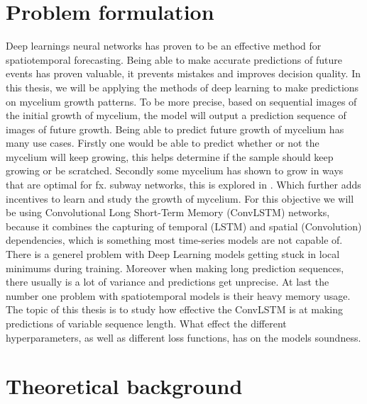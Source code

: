 \documentclass[a4paper,12pt]{article}
\begin{document}
\section{Problem formulation}
Deep learnings neural networks has proven to be an effective method for spatiotemporal forecasting. Being able to make accurate predictions of future events has proven valuable, it prevents mistakes and improves decision quality. In this thesis, we will be applying the methods of deep learning to make predictions on mycelium growth patterns.
To be more precise, based on sequential images of the initial growth of mycelium, the model will output a prediction sequence of images of future growth. Being able to predict future growth of mycelium has many use cases. Firstly one would be able to predict whether or not the mycelium will keep growing, this helps determine if the sample should keep growing or be scratched. Secondly some mycelium has shown to grow in ways that are optimal for fx. subway networks, this is explored in \cite{joseph2022slime}. 
Which further adds incentives to learn and study the growth of mycelium. For this objective we will be using Convolutional Long Short-Term Memory (ConvLSTM) networks, because it combines the capturing of temporal (LSTM) and spatial (Convolution) dependencies, which is something most time-series models are not capable of. There is a generel problem with Deep Learning models getting stuck in local minimums during training. Moreover when making long prediction sequences, there usually is a lot of variance and predictions get unprecise. At last the number one problem with spatiotemporal models is their heavy memory usage.
The topic of this thesis is to study how effective the ConvLSTM is at making predictions of variable sequence length. What effect the different hyperparameters, as well as different loss functions, has on the models soundness.
\section{Theoretical background}
\end{document}
